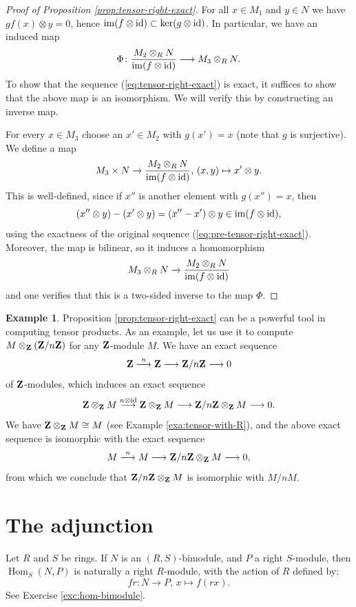 \documentclass[11pt]{amsbook}
\newcommand{\longto}{\longrightarrow}
\DeclareMathOperator\Hom{Hom}
\DeclareMathOperator\im{im}
\def\id{{\rm id}}
\theoremstyle{plain}
\theoremstyle{definition}
\newtheorem{example}[theorem]{Example}
\begin{document}
\begin{proof}[Proof of Proposition \ref{prop:tensor-right-exact}]
For all $x\in M_1$ and $y\in N$ we have $gf(x)\otimes y=0$, hence $\im (f\otimes \id) \subset \ker (g\otimes \id)$. In particular, we have an induced map
\begin{equation}\label{eq:tensor-exact-induced}
	\Phi\colon \frac{M_2\otimes_R N}{\im (f\otimes \id)} \longto M_3 \otimes_R N.
\end{equation}
To show that the sequence (\ref{eq:tensor-right-exact}) is exact, it suffices to show that the above map is an isomorphism.  We will verify this by constructing an inverse map.

For every $x\in M_3$ choose an $x'\in M_2$ with $g(x')=x$ (note that $g$ is surjective). We define a map
\[
	  M_3 \times N \to \frac{M_2\otimes_R N}{\im (f\otimes \id)},\,  (x,y) \mapsto x'\otimes y.
\]
This is well-defined, since if $x''$ is another element with $g(x'')=x$, then
\[
	(x''\otimes y) - (x'\otimes y) = (x''-x') \otimes y \in \im (f\otimes \id),
\]
using the exactness of the original sequence (\ref{eq:pre-tensor-right-exact}).
Moreover, the map is bilinear, so it induces a homomorphism 
\[
	M_3\otimes_R N \to \frac{M_2\otimes_R N}{\im (f\otimes \id)}
\]
and one verifies that this is a two-sided inverse to the map $\Phi$.
\end{proof}

\begin{example}
Proposition \ref{prop:tensor-right-exact} can be a powerful tool in computing tensor products. As an example, let us use it to compute $M\otimes_{\mathbf{Z}} ({\mathbf{Z}}/n{\mathbf{Z}})$ for any ${\mathbf{Z}}$-module $M$. We have an exact sequence
\[
	\bZ \overset{n}{\longto} \bZ \longto \bZ/n\bZ \longto 0
\]
of ${\mathbf{Z}}$-modules, which induces an exact sequence
\[
	\bZ\otimes_\bZ M \overset{n\otimes \id}{\longto} \bZ \otimes_\bZ M
	 \longto \bZ/n\bZ \otimes_\bZ M \longto 0.
\]
We have ${\mathbf{Z}}\otimes_{\mathbf{Z}} M \cong M$ (see Example \ref{exa:tensor-with-R}), and the above exact sequence is isomorphic with the exact sequence
\[
	M \overset{n}{\longto} M \longto \bZ/n\bZ \otimes_\bZ M \longto 0,
\]
from which we conclude that ${\mathbf{Z}}/n{\mathbf{Z}} \otimes_{\mathbf{Z}} M$ is isomorphic with $M/nM$.
\end{example}


\section{The adjunction}

Let $R$ and $S$ be rings. If $N$ is an $(R,S)$-bimodule, and $P$ a right $S$-module, then $\Hom_S(N,P)$ is naturally a right $R$-module, with the action of $R$ defined by:
\[
	fr\colon N \to P,\, x \mapsto f(rx).
\]
See Exercise \ref{exc:hom-bimodule}.
\end{document}
